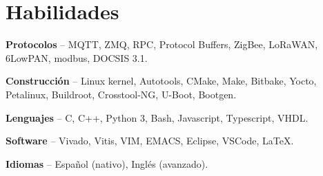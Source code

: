 \section{Habilidades}
\begin{small}
	\parbox[t][][t]{\linewidth}{
		\textbf{Protocolos} -- {MQTT, ZMQ, RPC, 
		Protocol Buffers, ZigBee, LoRaWAN, 6LowPAN, modbus, DOCSIS 3.1.}
		\bigbreak
	}
	\parbox[t][][t]{\linewidth}{
		\textbf{Construcción} -- {Linux kernel, 
		Autotools, CMake, Make, Bitbake, Yocto, Petalinux, Buildroot, Crosstool-NG, U-Boot, 
		Bootgen.}
		\bigbreak
	}
	\parbox[t][][t]{\linewidth}{
		\textbf{Lenguajes} -- {C, C++, Python 3, Bash, Javascript, Typescript, VHDL.}
		\bigbreak
	}
	\parbox[t][][t]{\linewidth}{
		\textbf{Software} -- {Vivado, Vitis, VIM, EMACS, Eclipse, VSCode, \LaTeX.}
		\bigbreak
	}
	\parbox[t][][t]{\linewidth}{
		\textbf{Idiomas} -- {Español (nativo), Inglés (avanzado).}
		\bigbreak
	}
\end{small}
